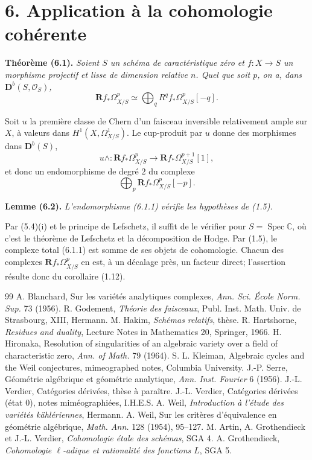 \documentclass[11pt]{article}
\DeclareMathOperator{\Spec}{Spec}
\newcommand{\bD}{\mathbf D}
\newcommand{\cO}{\mathcal O}
\newcommand{\bR}{\mathbf R}
\newcommand{\C}{\mathbb C}
\newenvironment{named}[1]{\par\medskip\noindent\textbf{#1}\itshape}{\par\medskip}
\begin{document}
\section*{6. Application à la cohomologie cohérente}
\begin{named}{Théorème (6.1).}
Soient $S$ un schéma de caractéristique zéro et $f:X\to S$ un morphisme projectif et lisse de dimension relative $n$. Quel que soit $p$, on a, dans $\bD^b(S,\cO_S)$,
\[
\bR f_*\Omega^p_{X/S}\simeq\bigoplus_q R^qf_*\Omega^p_{X/S}[-q].
\]
\end{named}
Soit $u$ la première classe de Chern d'un faisceau inversible relativement ample sur $X$, à valeurs dans $H^1(X,\Omega^1_{X/S})$. Le cup-produit par $u$ donne des morphismes dans $\bD^b(S)$,
\[
u\wedge:\bR f_*\Omega^p_{X/S}\longrightarrow \bR f_*\Omega^{p+1}_{X/S}[1],
\]
et donc un endomorphisme de degré $2$ du complexe
\begin{equation}\tag{6.1.1}
\bigoplus_p\bR f_*\Omega^p_{X/S}[-p].
\end{equation}

\begin{named}{Lemme (6.2).}
L'endomorphisme (6.1.1) vérifie les hypothèses de (1.5).
\end{named}
Par (5.4)(i) et le principe de Lefschetz, il suffit de le vérifier pour $S=\Spec\C$, où c'est le théorème de Lefschetz et la décomposition de Hodge. Par (1.5), le complexe total (6.1.1) est somme de ses objets de cohomologie. Chacun des complexes $\bR f_*\Omega^p_{X/S}$ en est, à un décalage près, un facteur direct; l'assertion résulte donc du corollaire (1.12).

\begin{thebibliography}{99}
 A. Blanchard, Sur les variétés analytiques complexes, \emph{Ann. Sci. École Norm. Sup.} 73 (1956).
 R. Godement, \emph{Théorie des faisceaux}, Publ. Inst. Math. Univ. de Strasbourg, XIII, Hermann.
 M. Hakim, \emph{Schémas relatifs}, thèse.
 R. Hartshorne, \emph{Residues and duality}, Lecture Notes in Mathematics 20, Springer, 1966.
 H. Hironaka, Resolution of singularities of an algebraic variety over a field of characteristic zero, \emph{Ann. of Math.} 79 (1964).
 S. L. Kleiman, Algebraic cycles and the Weil conjectures, mimeographed notes, Columbia University.
 J.-P. Serre, Géométrie algébrique et géométrie analytique, \emph{Ann. Inst. Fourier} 6 (1956).
 J.-L. Verdier, Catégories dérivées, thèse à paraître.
 J.-L. Verdier, Catégories dérivées (état 0), notes miméographiées, I.H.E.S.
 A. Weil, \emph{Introduction à l'étude des variétés kählériennes}, Hermann.
 A. Weil, Sur les critères d'équivalence en géométrie algébrique, \emph{Math. Ann.} 128 (1954), 95--127.
 M. Artin, A. Grothendieck et J.-L. Verdier, \emph{Cohomologie étale des schémas}, SGA 4.
 A. Grothendieck, \emph{Cohomologie $\ell$-adique et rationalité des fonctions $L$}, SGA 5.
\end{thebibliography}
\end{document}
